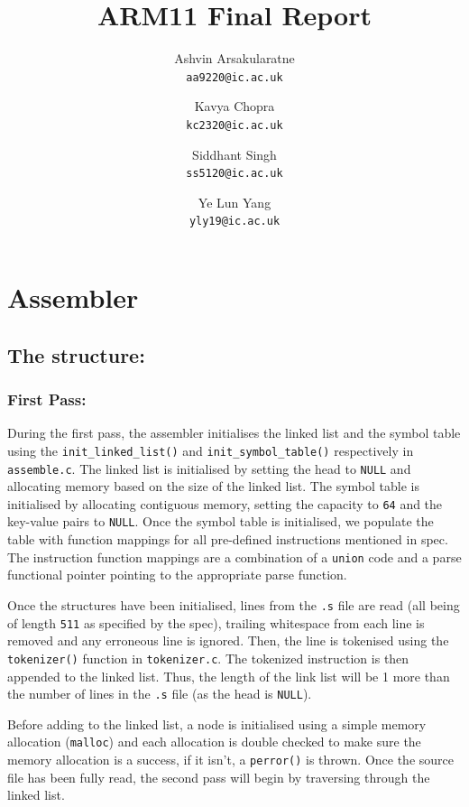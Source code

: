\documentclass[a4paper]{article}
\title{\textbf{ARM11 Final Report}}
\author{
  Ashvin Arsakularatne\\
  \texttt{aa9220@ic.ac.uk}
  \and
  Kavya Chopra\\
  \texttt{kc2320@ic.ac.uk}
  \and
  Siddhant Singh\\
  \texttt{ss5120@ic.ac.uk}
  \and
  Ye Lun Yang\\
  \texttt{yly19@ic.ac.uk}
}
\begin{document}
\maketitle

\section{Assembler}
\subsection{The structure:}\label{The structure}
\subsubsection{First Pass: }
During the first pass, the assembler initialises the linked list and the symbol table using the \verb|init_linked_list()| and \verb|init_symbol_table()| respectively in \verb|assemble.c|. The linked list is initialised by setting the head to \verb|NULL| and allocating memory based on the size of the linked list. The symbol table is initialised by allocating contiguous memory, setting the capacity to \verb|64| and the key-value pairs to \verb|NULL|. Once the symbol table is initialised, we populate the table with function mappings for all pre-defined instructions mentioned in spec. The instruction function mappings are a combination of a \verb|union| code and a parse functional pointer pointing to the appropriate parse function. 

Once the structures have been initialised, lines from the \verb|.s| file are read (all being of length \verb|511| as specified by the spec), trailing whitespace from each line is removed and any erroneous line is ignored. Then, the line is tokenised using the \verb|tokenizer()| function in \verb|tokenizer.c|. The tokenized instruction is then appended to the linked list. Thus, the length of the link list will be 1 more than the number of lines in the \verb|.s| file (as the head is \verb|NULL|). 

Before adding to the linked list, a node is initialised using a simple memory allocation (\verb|malloc|) and each allocation is double checked to make sure the memory allocation is a success, if it isn't, a \verb|perror()| is thrown. Once the source file has been fully read, the second pass will begin by traversing through the linked list.
\end{document}
